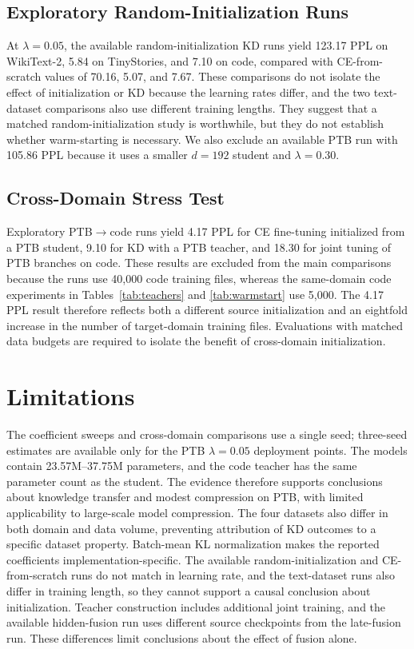\documentclass[conference]{IEEEtran}
\begin{document}
\subsection{Exploratory Random-Initialization Runs}

At $\lambda=0.05$, the available random-initialization KD runs yield 123.17
PPL on WikiText-2, 5.84 on TinyStories, and 7.10 on code, compared with
CE-from-scratch values of 70.16, 5.07, and 7.67.  These comparisons do not
isolate the effect of initialization or KD because the learning rates differ,
and the two text-dataset comparisons also use different training lengths.
They suggest that a matched random-initialization study is worthwhile, but
they do not establish whether warm-starting is necessary.  We also exclude an
available PTB run with 105.86 PPL because it uses a smaller $d=192$ student and
$\lambda=0.30$.

\subsection{Cross-Domain Stress Test}

Exploratory PTB$\rightarrow$code runs yield 4.17 PPL for CE fine-tuning
initialized from a PTB student, 9.10 for KD with a PTB teacher, and 18.30 for
joint tuning of PTB branches on code.  These results are excluded from the
main comparisons because the runs use 40,000 code training files, whereas
the same-domain code experiments in Tables~\ref{tab:teachers} and
\ref{tab:warmstart}
use 5,000.  The 4.17 PPL result therefore reflects both a different source
initialization and an eightfold increase in the number of target-domain
training files.  Evaluations with matched data budgets are required to
isolate the benefit of cross-domain initialization.

\section{Limitations}

The coefficient sweeps and cross-domain comparisons use a single seed;
three-seed estimates are available only for the PTB $\lambda=0.05$
deployment points.  The models contain 23.57M--37.75M parameters, and the code
teacher has the same parameter count as the student.  The evidence therefore
supports conclusions about knowledge transfer and modest compression on
PTB, with limited applicability to large-scale model compression.  The four
datasets also differ in both domain and data volume, preventing attribution
of KD outcomes to a specific dataset property.  Batch-mean KL
normalization makes the reported coefficients implementation-specific.  The
available random-initialization and CE-from-scratch runs do not match in
learning rate, and the text-dataset runs also differ in training length, so
they cannot support a causal conclusion about initialization.
Teacher construction includes additional joint training, and the available
hidden-fusion run uses different source checkpoints from the late-fusion run.
These differences limit conclusions about the effect of fusion alone.
\end{document}
